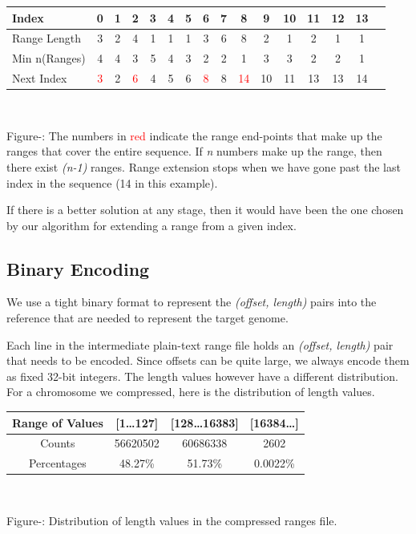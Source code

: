 \documentclass[11pt]{article}
\begin{document}
\begin{center}
  \begin{tabular}{|l|c|c|c|c|c|c|c|c|c|c|c|c|c|c|c|}
    \hline
    Index         & 0 & 1 & 2 & 3 & 4 & 5 & 6 & 7 & 8 & 9 &10 &11 &12 &13\\
    \hline
    Range Length  & 3 & 2 & 4 & 1 & 1 & 1 & 3 & 6 & 8 & 2 & 1 & 2 & 1 & 1\\
    \hline
    Min n(Ranges) & 4 & 4 & 3 & 5 & 4 & 3 & 2 & 2 & 1 & 3 & 3 & 2 & 2 & 1\\
    \hline
    Next Index    & \textcolor{red}{3} & 2 & \textcolor{red}{6} & 4 & 5 & 6 & \textcolor{red}{8} & 8 & \textcolor{red}{14} &10 &11 &13 &13 &14\\
    \hline
  \end{tabular}\\
  \vspace{0.3cm}

  \addtocounter{figure}{1}

  \footnotesize{Figure-: The numbers in
    \textcolor{red}{red} indicate the range end-points that make up
    the ranges that cover the entire sequence. If \textit{n} numbers
    make up the range, then there exist \textit{(n-1)} ranges. Range
    extension stops when we have gone past the last index in the
    sequence (14 in this example).}

\end{center}

If there is a better solution at any stage, then it would have been
the one chosen by our algorithm for extending a range from a given
index.

\subsection{Binary Encoding}

We use a tight binary format to represent the \textit{(offset,
  length)} pairs into the reference that are needed to represent the
target genome.

Each line in the intermediate plain-text range file holds an
\textit{(offset, length)} pair that needs to be encoded. Since offsets
can be quite large, we always encode them as fixed 32-bit
integers. The length values however have a different distribution. For
a chromosome we compressed, here is the distribution of length values.

\begin{center}
  \begin{tabular}{|c|c|c|c|}
    \hline
    Range of Values & [1\ldots{}127] & [128\ldots{}16383] & [16384\ldots{}]\\
    \hline
    Counts & 56620502 & 60686338 & 2602\\
    \hline
    Percentages & 48.27\% & 51.73\% & 0.0022\%\\
    \hline
  \end{tabular}\\
  \vspace{0.3cm}

  \addtocounter{figure}{1}
  \footnotesize{Figure-: Distribution of length values
    in the compressed ranges file.}

\end{center}
\end{document}
